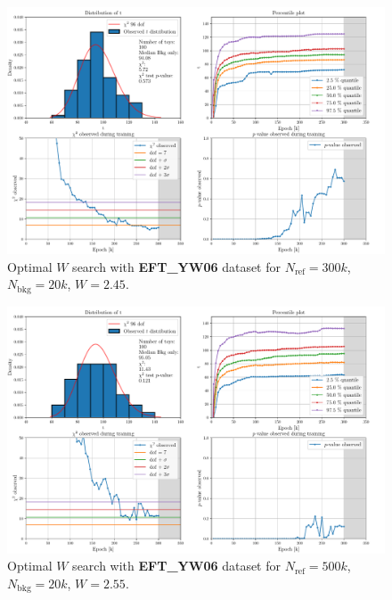 \vspace{-5mm}
\begin{figure}[H]
	\centering
	\includegraphics[width=1.0\textwidth]{Python/W_CLIP/ref300000_bkg20000_eft0/data_ref300000_bkg20000_eft0_wclip2-45.pdf}
	\caption{Optimal $W$ search with \textbf{EFT\_YW06} dataset for $N_\mathrm{ref}=300\si{k}$, $N_\mathrm{bkg}=20\si{k}$, $W=2.45$.}
	\label{fig:REF300000_BKG20000_EFT0_WCLIP2.45}
\end{figure}
\vspace{-5mm}
\begin{figure}[H]
	\centering
	\includegraphics[width=1.0\textwidth]{Python/W_CLIP/ref500000_bkg20000_eft0/data_ref500000_bkg20000_eft0_wclip2-55.pdf}
	\caption{Optimal $W$ search with \textbf{EFT\_YW06} dataset for $N_\mathrm{ref}=500\si{k}$, $N_\mathrm{bkg}=20\si{k}$, $W=2.55$.}
	\label{fig:REF500000_BKG20000_EFT0_WCLIP2.55}
\end{figure}
\vspace{-5mm}

